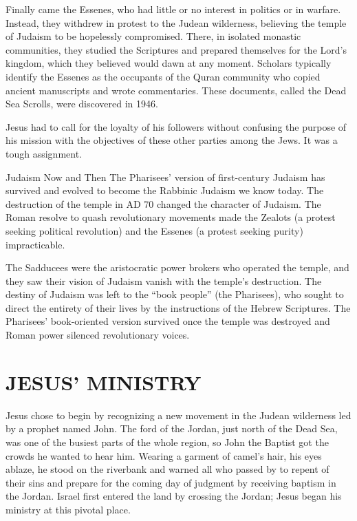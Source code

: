 Finally came the Essenes, who had little or no interest in politics or in warfare. Instead, they
withdrew in protest to the Judean wilderness, believing the temple of Judaism to be hopelessly
compromised. There, in isolated monastic communities, they studied the Scriptures and prepared
themselves for the Lord’s kingdom, which they believed would dawn at any moment. Scholars typically
identify the Essenes as the occupants of the Quran community who copied ancient manuscripts and
wrote commentaries. These documents, called the Dead Sea Scrolls, were discovered in 1946.

Jesus had to call for the loyalty of his followers without confusing the purpose of his mission with
the objectives of these other parties among the Jews. It was a tough assignment.

\begin{sidebar}{Judaism Now and Then}
The Pharisees’ version of first-century Judaism has survived and evolved to become the Rabbinic
Judaism we know today. The destruction of the temple in AD 70 changed the character of Judaism. The
Roman resolve to quash revolutionary movements made the Zealots (a protest seeking political
revolution) and the Essenes (a protest seeking purity) impracticable.

The Sadducees were the aristocratic power brokers who operated the temple, and they saw their vision
of Judaism vanish with the temple’s destruction. The destiny of Judaism was left to the “book
people” (the Pharisees), who sought to direct the entirety of their lives by the instructions of the
Hebrew Scriptures. The Pharisees’ book-oriented version survived once the temple was destroyed and
Roman power silenced revolutionary voices.
\end{sidebar}

\section{JESUS’ MINISTRY}

Jesus chose to begin by recognizing a new movement in the Judean wilderness led by a prophet named
John. The ford of the Jordan, just north of the Dead Sea, was one of the busiest parts of the whole
region, so John the Baptist got the crowds he wanted to hear him. Wearing a garment of camel’s hair,
his eyes ablaze, he stood on the riverbank and warned all who passed by to repent of their sins and
prepare for the coming day of judgment by receiving baptism in the Jordan. Israel first entered the
land by crossing the Jordan; Jesus began his ministry at this pivotal place.

